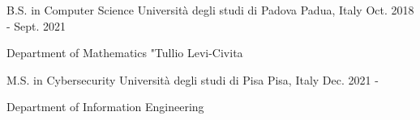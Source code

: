 

\begin{cventries}

  \cventry
    {B.S. in Computer Science} %
    {Università degli studi di Padova} %
    {Padua, Italy} %
    {Oct. 2018 - Sept. 2021} %
    {
		\begin{cvitems} %
			\item{Department of Mathematics "Tullio Levi-Civita}
		\end{cvitems}
    }
    
   \cventry
    {M.S. in Cybersecurity} %
    {Università degli studi di Pisa} %
    {Pisa, Italy} %
    {Dec. 2021 - } %
    {
		\begin{cvitems}
			\item{Department of Information Engineering}
		\end{cvitems}
    }

\end{cventries}
